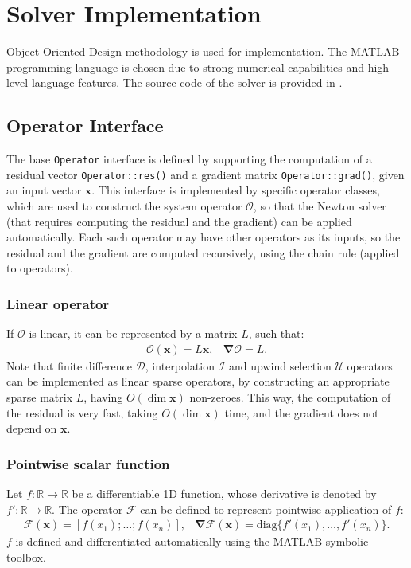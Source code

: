 \documentclass[MSc,beforeExam]{iitcsthesis}
\newcommand{\diag}{\ensuremath{\mathrm{diag}}}
\newcommand{\R}{\ensuremath{\mathbb{R}}}
\newcommand\bnabla{\boldsymbol{\nabla}}
\newcommand\bx{\boldsymbol{x}}
\newcommand\cF{\mathcal{F}}
\newcommand\cO{\mathcal{O}}
\newcommand\cI{\mathcal{I}}
\newcommand\cD{\mathcal{D}}
\begin{document}
\section{Solver Implementation}

Object-Oriented Design methodology is used for implementation.
The MATLAB programming language is chosen due to strong numerical capabilities
and high-level language features.
The source code of the solver is provided in \cite{source}.

\subsection{Operator Interface} \label{sec:operator-interface}
The base \verb|Operator| interface is defined by 
supporting the computation of a residual vector \verb|Operator::res()|
and a gradient matrix \verb|Operator::grad()|, given an input vector $\bx$.
This interface is implemented by specific operator classes,
which are used to construct the system operator $\cO$, so that 
the Newton solver (that requires computing the residual and the gradient) 
can be applied automatically.
Each such operator may have other operators as its inputs, so the residual
and the gradient are computed recursively, using the chain rule (applied to operators).

\subsubsection{Linear operator}
If $\cO$ is linear, it can be represented by a matrix $L$, such that:
\begin{equation}\begin{array}{cc}
\cO(\bx) = L \bx, &
\bnabla\cO = L. 
\end{array}\end{equation}
Note that finite difference $\cD$, interpolation $\cI$ and 
upwind selection $\mathcal{U}$ operators
can be implemented as linear sparse operators, by constructing 
an appropriate sparse matrix $L$, having $O(\dim \bx)$ non-zeroes.
This way, the computation of the residual is very fast, taking $O(\dim \bx)$ time,
and the gradient does not depend on $\bx$.

\subsubsection{Pointwise scalar function}
Let $f: \R \rightarrow \R$ be a differentiable 1D function, whose derivative is
denoted by $f': \R \rightarrow \R$. The operator $\cF$ can be defined to
represent pointwise application of $f$:
\begin{equation}\begin{array}{cc}
\cF(\bx) = [f(x_1); \ldots; f(x_n)], &
\bnabla\cF(\bx) = \diag\{f'(x_1), \ldots, f'(x_n)\}.
\end{array}\end{equation}
$f$ is defined and differentiated automatically using the MATLAB symbolic toolbox.
\end{document}
